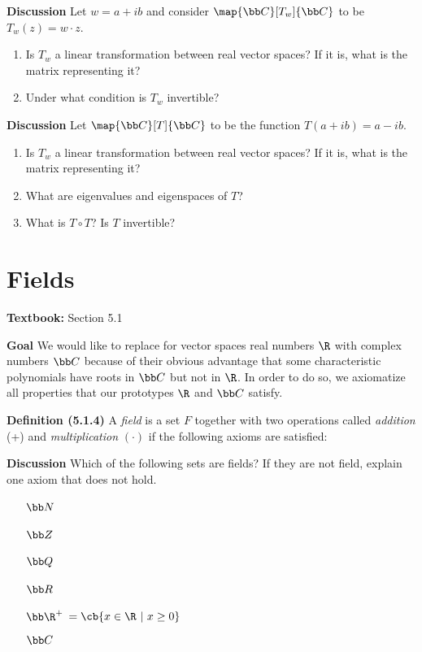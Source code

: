 \documentclass[letterpaper, 10pt]{article}
\begin{document}
\newpage
\lb
\textbf{Discussion}
\lb
Let $w = a+ ib$ and consider $\map{\bb C}[T_w]{\bb C}$ to be $T_w(z) = w \cdot z$.
\begin{enumerate}
    \item Is $T_w$ a linear transformation between real vector spaces? If it is, what is the
        matrix representing it?
    \item Under what condition is $T_w$ invertible?
\end{enumerate}


\newpage
\lb
\textbf{Discussion}
\lb
Let  $\map{\bb C}[T]{\bb C}$ to be the function $T(a + ib) = a - ib$.
\begin{enumerate}
    \item Is $T_w$ a linear transformation between real vector spaces? If it is, what is the
        matrix representing it?
    \item What are eigenvalues and eigenspaces of $T$?
    \item What is $T \circ T$? Is $T$ invertible?
\end{enumerate}














\newpage
\section*{Fields}%
\textbf{Textbook:} Section 5.1

\lb
\textbf{Goal}
\lb
We would like to replace for vector spaces real numbers $\R$ with complex numbers $\bb C$
because of their obvious advantage that some characteristic polynomials have roots in $\bb C$
but not in $\R$.
In order to do so, we axiomatize all properties that our prototypes $\R$ and $\bb C$ satisfy.


\lb
\textbf{Definition (5.1.4)}
\lb
A \emph{field} is a set $F$ together with two operations called
\emph{addition} (+) and \emph{multiplication} $( \cdot )$ if the following axioms are satisfied:



\newpage
\lb
\textbf{Discussion}
\lb
Which of the following sets are fields? If they are not field,
explain one axiom that does not hold.
\begin{enumerate}
    \item[$\bb N$]
    ~\vspace{20pt}
    \item[$\bb Z$]
    ~\vspace{20pt}
    \item[$\bb Q$]
    ~\vspace{20pt}
    \item[$\bb R$]
    ~\vspace{20pt}
    \item[$\bb \R^+$] $  = \cb{x \in \R ~ \vert ~ x \geq 0}$
    ~\vspace{20pt}
    \item[$\bb C$]
\end{enumerate}
\end{document}
